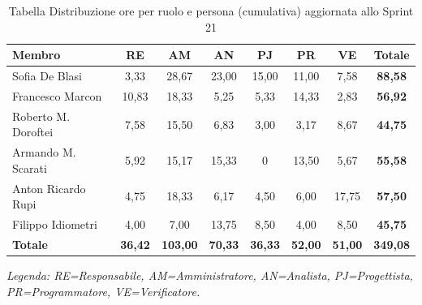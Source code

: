 \begin{table}[H]
    \centering
    \renewcommand{\arraystretch}{1.3}
    \begin{tabularx}{\textwidth}{|X|c|c|c|c|c|c|c|}
        \hline
        \textbf{Membro} & \textbf{RE} & \textbf{AM} & \textbf{AN} &
        \textbf{PJ} & \textbf{PR} & \textbf{VE} & \textbf{Totale} \\
        \hline
        Sofia De Blasi       & 3,33 & 28,67 & 23,00 & 15,00    & 11,00    & 7,58 & \textbf{88,58} \\
        \hline
        Francesco Marcon     & 10,83 & 18,33 & 5,25  & 5,33 & 14,33 & 2,83 & \textbf{56,92} \\
        \hline
        Roberto M. Doroftei  & 7,58 & 15,50 & 6,83  & 3,00    & 3,17    & 8,67 & \textbf{44,75} \\
        \hline
        Armando M. Scarati   & 5,92 & 15,17 & 15,33 & 0    & 13,50    & 5,67    & \textbf{55,58} \\
        \hline
        Anton Ricardo Rupi   & 4,75 & 18,33 & 6,17  & 4,50    & 6,00    & 17,75 & \textbf{57,50} \\
        \hline
        Filippo Idiometri    & 4,00 & 7,00  & 13,75 & 8,50    & 4,00    & 8,50 & \textbf{45,75} \\
        \hline
        \textbf{Totale}      & \textbf{36,42} & \textbf{103,00} & \textbf{70,33} & \textbf{36,33} & \textbf{52,00} & \textbf{51,00} & \textbf{349,08} \\
        \hline
    \end{tabularx}
    \begin{minipage}{\textwidth}
        \smallskip
        \footnotesize\textit{Legenda: RE=Responsabile, AM=Amministratore,
        AN=Analista, PJ=Progettista, PR=Programmatore, VE=Verificatore.}
    \end{minipage}
    \caption{Tabella Distribuzione ore per ruolo e persona (cumulativa) aggiornata allo Sprint 21}
\end{table}
